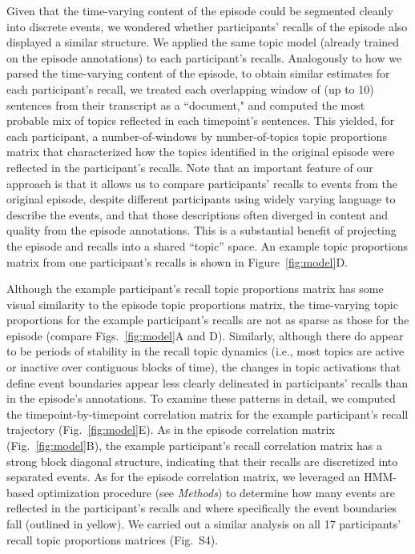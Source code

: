 \documentclass{article}
\newcommand{\corrmats}{S4}
\begin{document}
Given that the time-varying content of the episode could be segmented cleanly into discrete events, we wondered whether participants' recalls of the episode also displayed a similar structure.  We applied the same topic model (already trained on the episode annotations) to each participant's recalls.  Analogously to how we parsed the time-varying content of the episode, to obtain similar estimates for each participant's recall, we treated each overlapping  window of (up to 10) sentences from their transcript as a ``document," and computed the most probable mix of topics reflected in each timepoint's sentences.  This yielded, for each participant, a number-of-windows by number-of-topics topic proportions matrix that characterized how the topics identified in the original episode were reflected in the participant's recalls.  Note that an important feature of our approach is that it allows us to compare participants' recalls to events from the original episode, despite different participants using widely varying language to describe the events, and that those descriptions often diverged in content and quality from the episode annotations.  This is a substantial benefit of projecting the episode and recalls into a shared ``topic'' space.  An example topic proportions matrix from one participant's recalls is shown in Figure~\ref{fig:model}D.

Although the example participant's recall topic proportions matrix has some visual similarity to the episode topic proportions matrix, the time-varying topic proportions for the example participant's recalls are not as sparse as those for the episode (compare Figs.~\ref{fig:model}A and D).  Similarly, although there do appear to be periods of stability in the recall topic dynamics (i.e., most topics are active or inactive over contiguous blocks of time), the changes in topic activations that define event boundaries appear less clearly delineated in participants' recalls than in the episode's annotations.  To examine these patterns in detail, we computed the timepoint-by-timepoint correlation matrix for the example participant's recall trajectory (Fig.~\ref{fig:model}E).  As in the episode correlation matrix (Fig.~\ref{fig:model}B), the example participant's recall correlation matrix has a strong block diagonal structure, indicating that their recalls are discretized into separated events.  As for the episode correlation matrix, we leveraged an HMM-based optimization procedure (see \textit{Methods}) to determine how many events are reflected in the participant's recalls and where specifically the event boundaries fall (outlined in yellow).  We carried out a similar analysis on all 17 participants' recall topic proportions matrices (Fig.~\corrmats).
\end{document}
